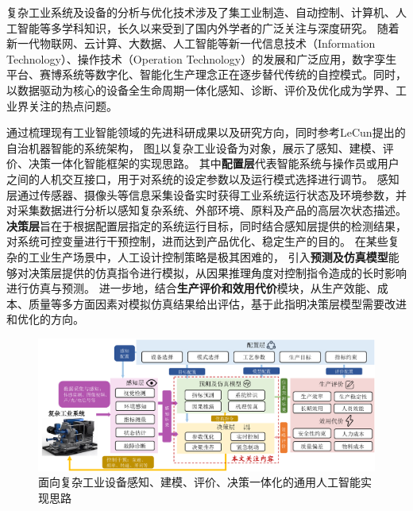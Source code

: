 

复杂工业系统及设备的分析与优化技术涉及了集工业制造、自动控制、计算机、人工智能等多学科知识，长久以来受到了国内外学者的广泛关注与深度研究。
随着新一代物联网、云计算、大数据、人工智能等新一代信息技术（Information Technology）、操作技术（Operation Technology）的发展和广泛应用，数字孪生平台、赛博系统等数字化、智能化生产理念正在逐步替代传统的自控模式。同时，以数据驱动为核心的设备全生命周期一体化感知、诊断、评价及优化成为学界、工业界关注的热点问题。

通过梳理现有工业智能领域的先进科研成果以及研究方向，同时参考LeCun提出的自治机器智能的系统架构\cite{lecun2022path}，
图\ref{fig:industrial_ai}以复杂工业设备为对象，展示了感知、建模、评价、决策一体化智能框架的实现思路。
其中\textbf{配置层}代表智能系统与操作员或用户之间的人机交互接口，用于对系统的设定参数以及运行模式选择进行调节。
感知层通过传感器、摄像头等信息采集设备实时获得工业系统运行状态及环境参数，并对采集数据进行分析以感知复杂系统、外部环境、原料及产品的高层次状态描述。
\textbf{决策层}旨在于根据配置层指定的系统运行目标，同时结合感知层提供的检测结果，对系统可控变量进行干预控制，进而达到产品优化、稳定生产的目的。
在某些复杂的工业生产场景中，人工设计控制策略是极其困难的，
引入\textbf{预测及仿真模型}能够对决策层提供的仿真指令进行模拟，从因果推理角度对控制指令造成的长时影响进行仿真与预测。
进一步地，结合\textbf{生产评价和效用代价}模块，从生产效能、成本、质量等多方面因素对模拟仿真结果给出评估，基于此指明决策层模型需要改进和优化的方向。

\begin{figure}
    \includegraphics[width=\linewidth]{figures/chapter1/industrial_ai.pdf}
    \caption{面向复杂工业设备感知、建模、评价、决策一体化的通用人工智能实现思路}
    \label{fig:industrial_ai}
\end{figure}

